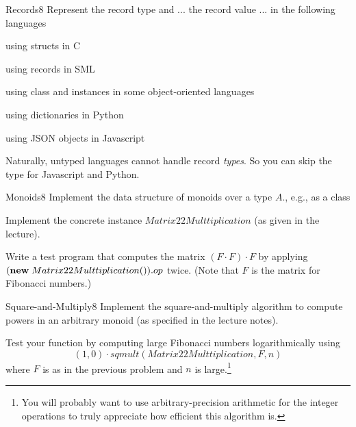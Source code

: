 \documentclass[a4paper]{article}
\begin{document}
\header


\begin{problem}{Records}{8}
Represent the record type and ... the record value ... in the following languages
\begin{compactitem}
 \item using structs in C
 \item using records in SML
 \item using class and instances in some object-oriented languages
 \item using dictionaries in Python
 \item using JSON objects in Javascript
\end{compactitem}

Naturally, untyped languages cannot handle record \emph{types}. So you can skip the type for Javascript and Python.
\end{problem}

\begin{problem}{Monoids}{8}
Implement the data structure of monoids over a type $A$., e.g., as a class

Implement the concrete instance $Matrix22Multtiplication$ (as given in the lecture).

Write a test program that computes the matrix $(F\cdot F)\cdot F$ by applying $({\rm \bf new}\; Matrix22Multtiplication()).op$ twice.
(Note that $F$ is the matrix for Fibonacci numbers.)
\end{problem}

\begin{problem}{Square-and-Multiply}{8}
Implement the square-and-multiply algorithm to compute powers in an arbitrary monoid (as specified in the lecture notes).

Test your function by computing large Fibonacci numbers logarithmically using
\[(1,0)\cdot sqmult(Matrix22Multtiplication, F, n)\]
where $F$ is as in the previous problem and $n$ is large.\footnote{You will probably want to use arbitrary-precision arithmetic for the integer operations to truly appreciate how efficient this algorithm is.}
\end{problem}
\end{document}
